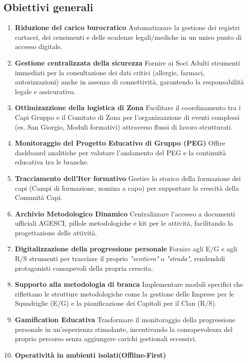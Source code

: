 \documentclass[11pt]{article}
\begin{document}
\subsection{Obiettivi generali}
\begin{enumerate}
  \item \textbf{Riduzione del carico burocratico}
  Automatizzare la gestione dei registri cartacei, dei censimenti e delle scadenze legali/mediche in un unico punto di accesso digitale.
  \item \textbf{Gestione centralizzata della sicurezza}
  Fornire ai Soci Adulti strumenti immediati per la consultazione dei dati critici (allergie, farmaci, autorizzazioni) anche in assenza di connettività, garantendo la responsabilità legale e assicurativa.
  \item \textbf{Ottimizazzione della logistica di Zona}
  Facilitare il coordinamento tra i Capi Gruppo e il Comitato di Zona per l'organizazzione di eventi complessi (es. San Giorgio, Moduli formativi) attraverso flussi di lavoro strutturati.
  \item \textbf{Monitoraggio del Progetto Educativo di Gruppo (PEG)}
  Offire dashboard analitiche per valutare l'andamento del PEG e la continuità educativa tra le branche.
  \item \textbf{Tracciamento dell'Iter formativo}
  Gestire lo storico della formazione dei capi (Campi di formazione, nomina a capo) per supportare la crescità della Comunità Capi.
  \item \textbf{Archivio Metodologico Dinamico}
  Centralizzare l'accesso a documenti ufficiali AGESCI, pillole metodologiche e kit per le attività, facilitando la progettazione delle attività.
  \item \textbf{Digitalizzazione della progressione personale}
  Fornire agli E/G e agli R/S strumenti per tracciare il proprio \textit{"sentiero"} o \textit{"strada"}, rendendoli protagonisti consapevoli della propria crescita.
  \item \textbf{Supporto alla metodologia di branca}
  Implementare moduli specifici che riflettano le strutture metodologiche come la gestione delle Imprese per le Squadriglie (E/G) e la pianificazione dei Capitoli per il Clan (R/S).
  \item \textbf{Gamification Educativa}
  Trasformare il monitoraggio della progressione personale in un'esperienza stimolante, incentivando la consapevolezza del proprio percorso senza aggiungere carichi gestionali eccessivi.
  \item \textbf{Operatività in ambienti isolati(Offline-First)}

\end{enumerate}
\end{document}
